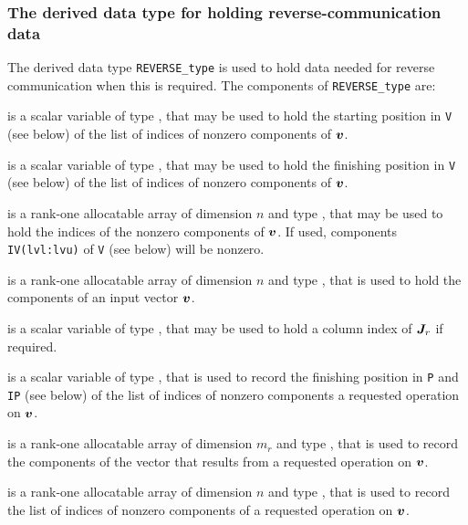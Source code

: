 \documentclass{galahad}
\begin{document}



\subsubsection{The derived data type for holding reverse-communication data}\label{typereverse}
The derived data type
{\tt REVERSE\_type}
is used to hold data needed for reverse communication when this is
required.
The components of
{\tt REVERSE\_type}
are:

\begin{description}

 is a scalar variable of type \integer, that
may be used to hold the starting position in {\tt V} (see below)
of the list of indices of nonzero components of ${\bm{v}}$.

 is a scalar variable of type \integer, that
may be used to hold the finishing position in {\tt V} (see below)
of the list of indices of nonzero components of ${\bm{v}}$.

 is a rank-one allocatable array of dimension $n$
and type \integer, that may be used to hold the indices of the
nonzero components of ${\bm{v}}$. If used, components
{\tt IV(lvl:lvu)} of {\tt V} (see below) will be nonzero.

 is a rank-one allocatable array of dimension $n$
and type \realdp, that is used to hold the components of an
input vector ${\bm{v}}$.

 is a scalar variable of type \integer, that
may be used to hold a column index of ${\bm{J}}_r$ if required.

 is a scalar variable of type \integer, that
is used to record the finishing position in 
{\tt P} and {\tt IP} (see below)
of the list of indices of nonzero components a requested operation on ${\bm{v}}$.

 is a rank-one allocatable array of dimension $m_r$
and type \realdp, that is used to record the components of the
vector that results from a requested operation on ${\bm{v}}$.

 is a rank-one allocatable array of dimension $n$
and type \integer, that is used to record the list of
indices of nonzero components of a requested operation on ${\bm{v}}$.

\end{description}



\end{document}
